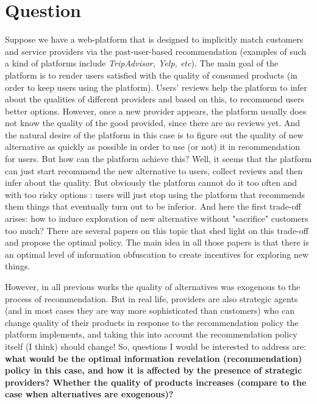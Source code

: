 \documentclass[a4paper]{article}
\begin{document}
	
	\section{Question}
	Suppose we have a web-platform that is designed to implicitly match customers and service providers via the past-user-based recommendation (examples of such a kind of platforms include \textit{TripAdvisor, Yelp, etc}). The main goal of the platform is to render users satisfied with the quality of consumed products (in order to keep users using the platform). Users' reviews help the platform to infer about the qualities of different providers and based on this, to recommend users better options. However, once a new provider appears, the platform usually does not know the quality of the good provided, since there are no reviews yet. And the natural desire of the platform in this case is to figure out the quality of new alternative as quickly as possible in order to use (or not) it in recommendation for users. But how can the platform achieve this? Well, it seems that the platform can just start recommend the new alternative to users, collect reviews and then infer about the quality. But obviously the platform cannot do it too often and with too risky options : users will just stop using the platform that recommends them things that eventually turn out to be inferior. And here the first trade-off arises: how to induce exploration of new alternative without "sacrifice" customers too much? There are several papers on this topic that shed light on this trade-off and propose the optimal policy. The main idea in all those papers is that there is an optimal level of information obfuscation to create incentives for exploring new things. 
	
	
	
	However, in all previous works the quality of alternatives was exogenous to the process of recommendation. But in real life, providers are also strategic agents (and in most cases they are way more sophisticated than customers) who can change quality of their products in response to the recommendation policy the platform implements, and taking this into account the recommendation policy itself (I think) should change! So, questions I would be interested to address are: \textbf{what would be the optimal information revelation (recommendation) policy in this case, and how it is affected by the presence of strategic providers? Whether the quality of products increases (compare to the case when alternatives are exogenous)?}
	
\end{document}
